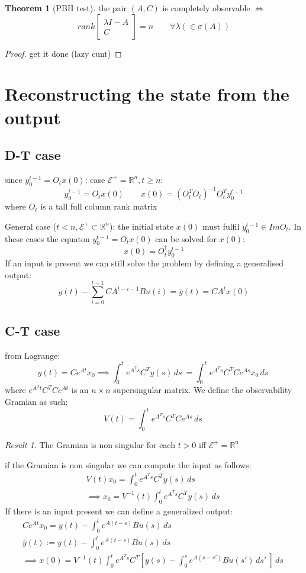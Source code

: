 \documentclass{book}
\newcommand{\R}{\mathbb{R}}
\theoremstyle{definition}
\newtheorem{theorem}{Theorem}[section]
\theoremstyle{remark}
\theoremstyle{remark}
\newtheorem*{result}{Result}
\begin{document}
\begin{theorem}[PBH test]
    the pair $(A,C)$ is completely observable $\iff$ 
    \[
    rank\begin{bmatrix}
        \lambda I- A \\ C
    \end{bmatrix}=n \qquad \forall \lambda (\in \sigma(A))
    \]
\end{theorem}
\begin{proof}
    get it done (lazy cunt)
\end{proof}

\section{Reconstructing the state from the output}
\subsection{D-T case}
since $y_0^{t-1}=O_tx(0)$:
case $\mathcal{E}^+=\R^n, t\geq n$:
\[
    y_0^{t-1}=O_tx(0) \qquad x(0)=(O_t^TO_t)^{-1}O_t^Ty_0^{t-1}
\]
where $O_t$ is a tall full column rank matrix

General case ($t<n, \mathcal{E}^+\subset \R^n$): the initial state $x(0)$ must fulfil $y_0^{t-1}\in ImO_t$. In these cases the equaton $y_0^{t-1}=O_tx(0)$ can be solved for $x(0)$:
\[
x(0)=O_t^{\dagger}y_0^{t-1}
\]
If an input is present we can still solve the problem by defining a generalised output:
\[
    y(t)-\sum_{i=0}^{t-1}CA^{t-i-1}Bu(i)=\bar{y}(t)=CA^tx(0)
\]
\subsection{C-T case}
from Lagrange:
\[
y(t)=Ce^{At}x_0 \implies \int_0^te^{A^Ts}C^Ty(s)\,ds\ = \int_0^te^{A^Ts}C^TCe^{As}x_0\,ds\
\]
where $e^{A^Tt}C^TCe^{At}$ is an $n \times n$ supersingular matrix.
We define the observability Gramian as such:
\[
V(t)=\int_0^te^{A^Ts}C^TCe^{As}\,ds\
\]
\begin{result}
    The Gramian is non singular for each $t>0$ iff $\mathcal{E}^+=\R^n$
\end{result}
if the Gramian is non singular we can compute the input as follows:
\begin{align*}
    V(t)x_0=\int_0^te^{A^Ts}C^Ty(s)\,ds\ \\
    \implies x_0=V^{-1}(t)\int_0^te^{A^Ts}C^Ty(s)\,ds\
\end{align*}
If there is an input present we can define a generalized output:
\begin{gather*}
    Ce^{At}x_0=y(t) - \int_0^t e^{A(t-s)}Bu(s)\,ds\ \\
    \bar{y}(t):=y(t)-\int_0^t e^{A(t-s)}Bu(s)\,ds\ \\
    \implies x(0)=V^{-1}(t)\int_0^t {e^{A^Ts}C^T \left[ y(s) - \int_0^s e^{A(s-s')}Bu(s') \, ds'\ \right]} \, ds\
\end{gather*}
\end{document}
